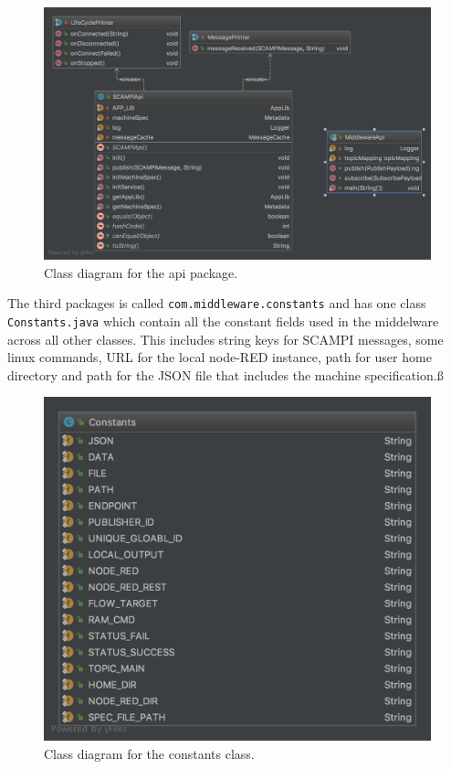  \begin{figure}[H]
 	\centering
 	\includegraphics[scale=0.2]{images/cd-api.png}
 	\caption{Class diagram for the api package. }
 	\label{fig:cd-api}
 \end{figure}
 
 \noindent The third packages is called \verb|com.middleware.constants| and has one class \verb|Constants.java| which contain all the constant fields used in the middelware across all other classes. This includes string keys for SCAMPI messages, some linux commands,  URL for the local node-RED instance, path for user home directory and path for the JSON file that includes the machine specification.ß
 
 \begin{figure}[H]
 	\centering
 	\includegraphics[scale=0.18]{images/constants.png}
 	\caption{Class diagram for the constants class. }
 	\label{fig:cd-constants}
 \end{figure}


